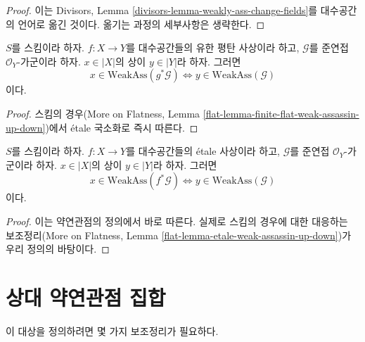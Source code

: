 \begin{proof}
이는 Divisors, Lemma
\ref{divisors-lemma-weakly-ass-change-fields}를 대수공간의 언어로
옮긴 것이다. 옮기는 과정의 세부사항은 생략한다.
\end{proof}

\begin{lemma}
\label{lemma-finite-flat-weak-assassin-up-down}
$S$를 스킴이라 하자. $f : X \to Y$를 대수공간들의 유한 평탄 사상이라 하고,
$\mathcal{G}$를 준연접 $\mathcal{O}_Y$-가군이라 하자.
$x \in |X|$의 상이 $y \in |Y|$라 하자. 그러면
$$
x \in \text{WeakAss}(g^*\mathcal{G})
\Leftrightarrow
y \in \text{WeakAss}(\mathcal{G})
$$
이다.
\end{lemma}

\begin{proof}
스킴의 경우(More on Flatness, Lemma
\ref{flat-lemma-finite-flat-weak-assassin-up-down})에서 \'etale 국소화로
즉시 따른다.
\end{proof}

\begin{lemma}
\label{lemma-etale-weak-assassin-up-down}
$S$를 스킴이라 하자. $f : X \to Y$를 대수공간들의 \'etale 사상이라 하고,
$\mathcal{G}$를 준연접 $\mathcal{O}_Y$-가군이라 하자.
$x \in |X|$의 상이 $y \in |Y|$라 하자. 그러면
$$
x \in \text{WeakAss}(f^*\mathcal{G})
\Leftrightarrow
y \in \text{WeakAss}(\mathcal{G})
$$
이다.
\end{lemma}

\begin{proof}
이는 약연관점의 정의에서 바로 따른다. 실제로 스킴의 경우에 대한
대응하는 보조정리(More on Flatness, Lemma
\ref{flat-lemma-etale-weak-assassin-up-down})가 우리 정의의 바탕이다.
\end{proof}







\section{상대 약연관점 집합}
\label{section-relative-weak-assassin}

\noindent
이 대상을 정의하려면 몇 가지 보조정리가 필요하다.

